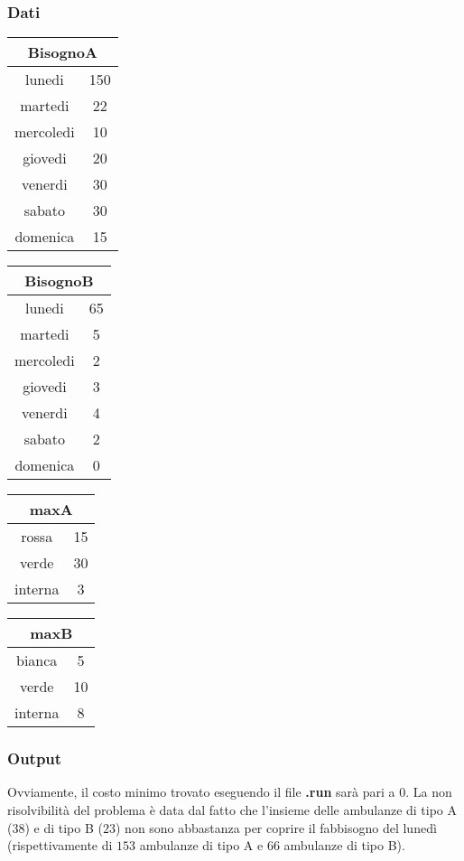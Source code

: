 \subsubsection{Dati}
\begin{center}
\begin{tabular}{| c | c |}
    \hline
    \multicolumn{2}{|c|}{BisognoA}\\
    \hline \hline
    lunedi & 150 \\
    martedi & 22 \\
    mercoledi & 10 \\
    giovedi & 20 \\
    venerdi & 30 \\
    sabato & 30 \\
    domenica & 15 \\
    \hline
\end{tabular}
\begin{tabular}{| c | c |}
    \hline
    \multicolumn{2}{|c|}{BisognoB}\\
    \hline \hline
    lunedi & 65 \\
    martedi & 5 \\
    mercoledi & 2 \\
    giovedi & 3 \\
    venerdi & 4 \\
    sabato & 2 \\
    domenica & 0 \\
    \hline
\end{tabular}
\begin{tabular}{| c | c |}
    \hline
    \multicolumn{2}{|c|}{maxA}\\
    \hline \hline
    rossa & 15 \\
    verde & 30 \\
    interna & 3 \\
    \hline    
\end{tabular}
\begin{tabular}{| c | c |}
    \hline
    \multicolumn{2}{|c|}{maxB} \\
    \hline \hline
    bianca & 5 \\
    verde & 10 \\
    interna & 8 \\
    \hline    
\end{tabular}
\end{center}
\subsubsection{Output}
Ovviamente, il costo minimo trovato eseguendo il file \textbf{.run} sarà pari a \texteuro$0$. La non risolvibilità del problema è data dal fatto che l'insieme delle ambulanze di tipo A ($38$) e di tipo B ($23$) non sono abbastanza per coprire il fabbisogno del lunedì (rispettivamente di $153$ ambulanze di tipo A e $66$ ambulanze di tipo B).

